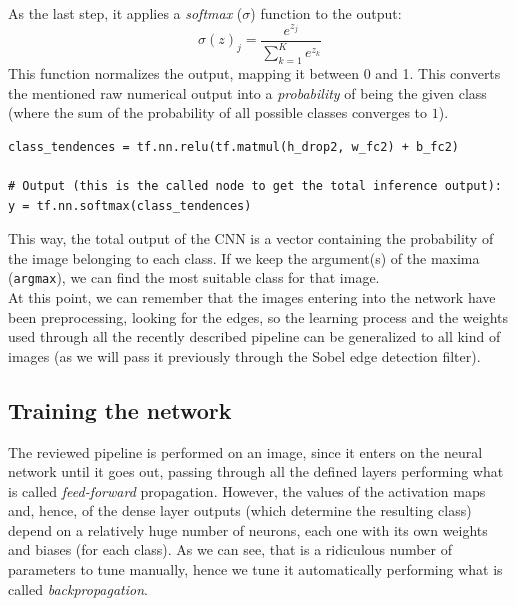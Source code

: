 \begin{enumerate}
			As the last step, it applies a \textit{softmax} ($\sigma$) function to the output:
			\begin{equation}
				\sigma(z)_j = \frac{e^{z_j}}{\sum_{k=1}^{K}e^{z_k}}
			\end{equation}
			This function normalizes the output, mapping it between 0 and 1. This converts the mentioned raw numerical output into a \emph{probability} of being the given class (where the sum of the probability of all possible classes converges to $1$).
			
			\begin{lstlisting}
class_tendences = tf.nn.relu(tf.matmul(h_drop2, w_fc2) + b_fc2)

# Output (this is the called node to get the total inference output):
y = tf.nn.softmax(class_tendences)
			\end{lstlisting}
			
		\end{enumerate}
		
		This way, the total output of the CNN is a vector containing the probability of the image belonging to each class. If we keep the argument(s) of the maxima (\texttt{argmax}), we can find the most suitable class for that image.\\
		
		At this point, we can remember that the images entering into the network have been preprocessing, looking for the edges, so the learning process and the weights used through all the recently described pipeline can be generalized to all kind of images (as we will pass it previously through the Sobel edge detection filter).\\
			

		\subsection{Training the network}
		\label{sec:4_train}
			The reviewed pipeline is performed on an image, since it enters on the neural network until it goes out, passing through all the defined layers performing what is called \emph{feed-forward} propagation. However, the values of the activation maps and, hence, of the dense layer outputs (which determine the resulting class) depend on a relatively huge number of neurons, each one with its own weights and biases (for each class). As we can see, that is a ridiculous number of parameters to tune manually, hence we tune it automatically performing what is called \emph{backpropagation}.\\
			

